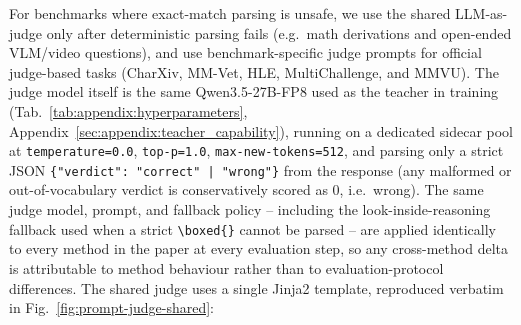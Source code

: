 For benchmarks where exact-match parsing is unsafe, we use the shared LLM-as-judge only after deterministic parsing fails (e.g.\ math derivations and open-ended VLM/video questions), and use benchmark-specific judge prompts for official judge-based tasks (CharXiv, MM-Vet, HLE, MultiChallenge, and MMVU). The judge model itself is the same Qwen3.5-27B-FP8 used as the teacher in training (Tab.~\ref{tab:appendix:hyperparameters}, Appendix~\ref{sec:appendix:teacher_capability}), running on a dedicated sidecar pool at \texttt{temperature=0.0}, \texttt{top-p=1.0}, \texttt{max-new-tokens=512}, and parsing only a strict JSON \texttt{\{"verdict": "correct"\,|\,"wrong"\}} from the response (any malformed or out-of-vocabulary verdict is conservatively scored as $0$, i.e.\ wrong). The same judge model, prompt, and fallback policy -- including the look-inside-reasoning fallback used when a strict \texttt{\textbackslash boxed\{\}} cannot be parsed -- are applied identically to every method in the paper at every evaluation step, so any cross-method delta is attributable to method behaviour rather than to evaluation-protocol differences. The shared judge uses a single Jinja2 template, reproduced verbatim in Fig.~\ref{fig:prompt-judge-shared}:
